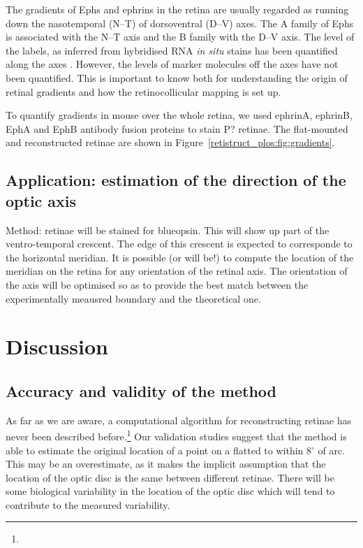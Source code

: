 \documentclass[10pt]{article}
\begin{document}
The gradients of Ephs and ephrins in the retina are usually regarded
as running down the nasotemporal (N--T) of dorsoventral (D--V)
axes. The A family of Ephs is associated with the N--T axis and the B
family with the D--V axis. The level of the labels, as inferred from
hybridised RNA \emph{in situ} stains has been quantified along the
axes \cite{ChenEtal95comp,RebeEtal04rela}.  However, the levels of
marker molecules off the axes have not been quantified. This is
important to know both for understanding the origin of retinal
gradients and how the retinocollicular mapping is set up. 

To quantify gradients in mouse over the whole retina, we used ephrinA,
ephrinB, EphA and EphB antibody fusion proteins to stain P?
retinae. The flat-mounted and reconstructed retinae are shown in
Figure~\ref{retistruct_plos:fig:gradients}.

\subsection*{Application: estimation of the direction of the optic axis}
\label{retistruct_plos:sec:appl-estim-direct}

Method: retinae will be stained for blueopsin. This will show up part
of the ventro-temporal crescent. The edge of this crescent is expected
to corresponde to the horizontal meridian. It is possible (or will
be!) to compute the location of the meridian on the retina for any
orientation of the retinal axis.  The orientation of the axis will be
optimised so as to provide the best match between the experimentally
meausred boundary and the theoretical one.


\section*{Discussion}

\subsection*{Accuracy and validity of the method}

As far as we are aware, a computational algorithm for reconstructing
retinae has never been described
before.\footnote{} Our validation
studies suggest that the method is able to estimate the original
location of a point on a flatted to within 8$^\circ$ of arc. This may
be an overestimate, as it makes the implicit assumption that the
location of the optic disc is the same between different retinae.
There will be some biological variability in the location of the
optic disc which will tend to contribute to the measured variability.
\end{document}
